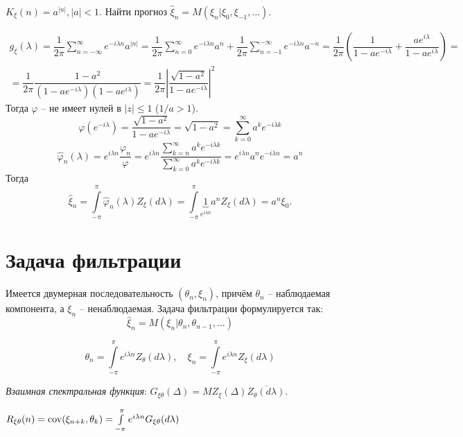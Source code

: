 \begin{ex}
  $K_\xi(n) = a^{|n|}, |a| < 1$. Найти прогноз $\hat{\xi}_n = M(\xi_n | \xi_0, \xi_{-1}, \dots).$

  \begin{multline*}
    g_\xi(\lambda) = \dfrac{1}{2\pi} \sum_{n=-\infty}^\infty e^{- i\lambda n} a^{|n|} =
    \dfrac{1}{2\pi} \sum_{n=0}^\infty e^{- i\lambda n} a^n + \dfrac{1}{2\pi}\sum_{n=-1}^{-\infty} e^{-i\lambda n} a^{-n} =
    \dfrac{1}{2\pi} \left( \dfrac{1}{1 - ae^{-i\lambda}} + \dfrac{ae^{i\lambda}}{1 - ae^{i\lambda}} \right) = \\
    = \dfrac{1}{2\pi} \dfrac{1 - a^2}{(1-ae^{-i\lambda})(1-ae^{i\lambda})} = 
    \dfrac{1}{2\pi} \left| \dfrac{\sqrt{1-a^2}}{1-ae^{-i\lambda}} \right|^2
  \end{multline*}
  Тогда $\varphi$ -- не имеет нулей
  в $|z| \leqslant 1$ ($1/a > 1$).
  \[
    \varphi(e^{-i\lambda}) = \dfrac{\sqrt{1-a^2}}{1 - ae^{-i\lambda}} = 
    \sqrt{1-a^2} = \sum_{k=0}^\infty a^k e^{-i\lambda k}
  \]
  \[
    \hat{\varphi}_n(\lambda) = e^{i\lambda n} \dfrac{\varphi_n}{\varphi} = e^{i\lambda n} \dfrac{\sum_{k=n}^\infty a^k e^{-i\lambda k}}{\sum_{k=0}^\infty a^k e^{-i\lambda k}} = e^{i\lambda n} a^n e^{-i\lambda n} = a^n
  \]
  Тогда
  \[
    \hat{\xi}_n = \int\limits_{-\pi}^\pi \hat{\varphi}_n(\lambda) Z_\xi(d\lambda) = 
    \int\limits_{-\pi}^\pi \underbrace{1}_{e^{i\lambda 0}} a^n Z_\xi(d\lambda) = a^n \xi_0.
  \]
\end{ex}

\section{Задача фильтрации}

Имеется двумерная последовательность $(\theta_n, \xi_n)$, причём $\theta_n$ -- наблюдаемая
компонента, а $\xi_n$ -- ненаблюдаемая. Задача фильтрации формулируется так:
\[
  \hat{\xi}_n = M(\xi_n | \theta_n, \theta_{n-1}, \dots)
\]

\[
  \theta_n = \int\limits_{-\pi}^\pi e^{i\lambda n} Z_\theta(d\lambda), \quad
  \xi_n = \int\limits_{-\pi}^\pi e^{i\lambda n} Z_\xi(d\lambda)
\]

\begin{definition}
  \emph{Взаимная спектральная функция}:
  $G_{\xi \theta} (\Delta) = M Z_\xi(\Delta) \overline{Z_\theta(d\lambda)}.$

  $R_{\xi\theta}(n) = \operatorname{cov} (\xi_{n+k}, \theta_k) = \int\limits_{-\pi}^\pi e^{i\lambda n} G_{\xi\theta}(d\lambda)$
\end{definition}

